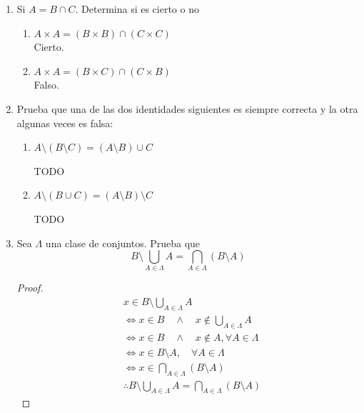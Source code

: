 \documentclass[11pt,letterpaper]{report}
\begin{document}
\begin{enumerate}
\item Si $A = B \cap C$. Determina si es cierto o no
\begin{enumerate}
    \item $A \times A = (B \times B) \cap (C \times C)$\\
    Cierto.

    \item $A \times A = (B \times C) \cap (C \times B)$\\
    Falso.
\end{enumerate}


\item Prueba que una de las dos identidades siguientes es siempre correcta y la otra algunas veces
es falsa:
\begin{enumerate}
    \item $A \setminus (B \setminus C) = (A \setminus B) \cup C$
    
    TODO

    \item $A \setminus (B \cup C) = (A \setminus B) \setminus C$
    
    TODO
\end{enumerate}

\item Sea $\Lambda$ una clase de conjuntos. Prueba que
$$B \setminus \bigcup_{A \in \Lambda} A = \bigcap_{A \in \Lambda} (B \setminus A)$$
\begin{proof}
    \begin{align*}
        & x \in B \setminus \bigcup_{A \in \Lambda} A\\
        &\iff x \in B \quad \land \quad x \notin \bigcup_{A \in \Lambda} A\\
        &\iff x \in B \quad \land \quad x \notin A, \forall A \in \Lambda\\
        &\iff x \in B \setminus A, \quad \forall A \in \Lambda\\
        &\iff x \in \bigcap_{A \in \Lambda} (B \setminus A)\\
        &\therefore B \setminus \bigcup_{A \in \Lambda} A = \bigcap_{A \in \Lambda} (B \setminus A)
    \end{align*}
\end{proof}

\end{enumerate}
\end{document}
